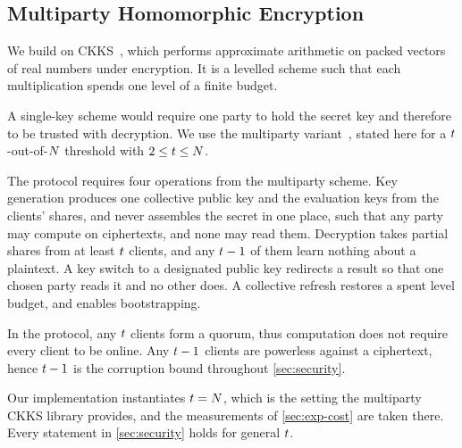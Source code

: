\subsection{Multiparty Homomorphic Encryption}
\label{sec:mhe}

We build on CKKS~\cite{cheon2017ckks}, which performs approximate arithmetic on
packed vectors of real numbers under encryption. It is
a levelled scheme such that each multiplication spends one
level of a finite budget.

A single-key scheme would require one party to hold the secret key and therefore
to be trusted with decryption. We use the multiparty
variant~\cite{mouchet2021multiparty}, stated here for a $t$-out-of-$N$
threshold with $2\le t\le N$. 

The protocol requires four operations from the multiparty scheme. Key
generation produces one collective public key and the evaluation keys from the
clients' shares, and never assembles the secret in one place, such that any party may
compute on ciphertexts, and none may read them. Decryption takes partial shares
from at least $t$ clients, and any $t-1$ of them learn nothing about a
plaintext. A key switch to a designated public key redirects a result so that one
chosen party reads it and no other does. A collective refresh restores a spent
level budget, and enables bootstrapping. 

In the protocol, any $t$ clients form a
quorum, thus computation does not require every client to be online. Any $t-1$
clients are powerless against a ciphertext, hence $t-1$ is the corruption bound
throughout \cref{sec:security}. 

Our implementation instantiates $t=N$, which is the setting the multiparty
CKKS library provides, and the measurements of \cref{sec:exp-cost} are taken
there. Every statement in \cref{sec:security} holds for general $t$.

